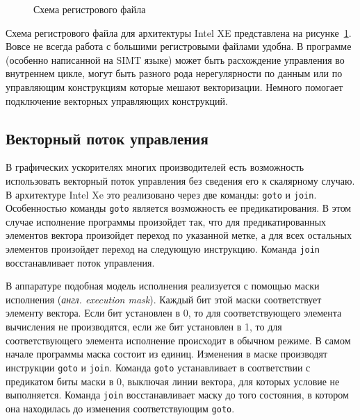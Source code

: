 \begin{figure}[ht]
    \caption{Схема регистрового файла}\label{fig:genisa-addressing-base}
\end{figure}

Схема регистрового файла для архитектуры Intel XE представлена на рисунке~\cref{fig:genisa-addressing-base}. Вовсе не всегда работа с большими регистровыми файлами удобна. В программе (особенно написанной на SIMT языке) может быть расхождение управления во внутреннем цикле, могут быть разного рода нерегулярности по данным или по управляющим конструкциям которые мешают векторизации. Немного помогает подключение векторных управляющих конструкций.

\subsection{Векторный поток управления}\label{subsec:overview/logical/simdcf}

В графических ускорителях многих производителей есть возможность использовать векторный поток управления без сведения его к скалярному случаю. В архитектуре Intel Xe это реализовано через две команды: \texttt{goto} и \texttt{join}. Особенностью команды \texttt{goto} является возможность ее предикатирования. В этом случае исполнение программы произойдет так, что для предикатированных элементов вектора произойдет переход по указанной метке, а для всех остальных элементов произойдет переход на следующую инструкцию. Команда \texttt{join} восстанавливает поток управления.

В аппаратуре подобная модель исполнения реализуется с помощью маски исполнения (\textit{англ. execution mask}). Каждый бит этой маски соответствует элементу вектора. Если бит установлен в 0, то для соответствующего элемента вычисления не производятся, если же бит установлен в 1, то для соответствующего элемента исполнение происходит в обычном режиме. В самом начале программы маска состоит из единиц. Изменения в маске производят инструкции \texttt{goto} и \texttt{join}. Команда \texttt{goto} устанавливает в соответствии с предикатом биты маски в 0, выключая линии вектора, для которых условие не выполняется. Команда \texttt{join} восстанавливает маску до того состояния, в котором она находилась до изменения соответствующим \texttt{goto}.

